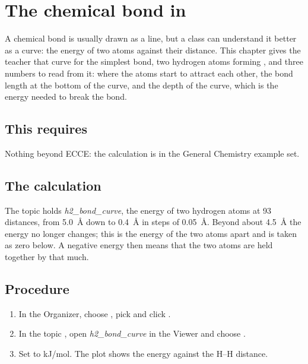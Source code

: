 \chapter{The chemical bond in }
\label{ch:t-h2-bond}

A chemical bond is usually drawn as a line, but a class can understand it better as a curve: the energy of two atoms against their distance. This chapter gives the teacher that curve for the simplest bond, two hydrogen atoms forming , and three numbers to read from it: where the atoms start to attract each other, the bond length at the bottom of the curve, and the depth of the curve, which is the energy needed to break the bond.

\section*{This requires}
Nothing beyond ECCE: the calculation is in the General Chemistry example set.

\section{The calculation}
The topic  holds \emph{h2\_bond\_curve}, the energy of two hydrogen atoms at 93 distances, from \SI{5.0}{\angstrom} down to \SI{0.4}{\angstrom} in steps of \SI{0.05}{\angstrom}. Beyond about \SI{4.5}{\angstrom} the energy no longer changes; this is the energy of the two atoms apart and is taken as zero below. A negative energy then means that the two atoms are held together by that much.

\section{Procedure}
\begin{enumerate}
	\item In the Organizer, choose , pick  and click .
	\item In the topic , open \emph{h2\_bond\_curve} in the Viewer and choose .
	\item Set  to kJ/mol. The plot shows the energy against the H--H distance.
\end{enumerate}

